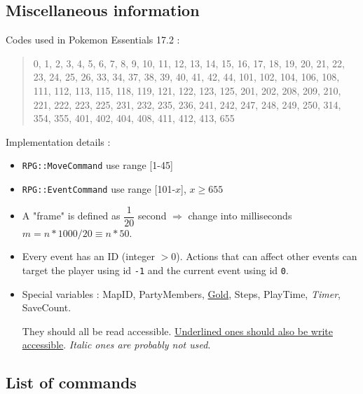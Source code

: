 \documentclass[11pt]{article}
\begin{document}

\subsection{Miscellaneous information}

Codes used in Pokemon Essentials 17.2 :
\begin{quote}
	0, 1, 2, 3, 4, 5, 6, 7, 8, 9, 10, 11, 12, 13, 14, 15, 16, 17, 18, 19, 20, 21, 22, 23, 24, 25, 26, 33, 34, 37, 38, 39, 40, 41, 42, 44, 101, 102, 104, 106, 108, 111, 112, 113, 115, 118, 119, 121, 122, 123, 125, 201, 202, 208, 209, 210, 221, 222, 223, 225, 231, 232, 235, 236, 241, 242, 247, 248, 249, 250, 314, 354, 355, 401, 402, 404, 408, 411, 412, 413, 655
\end{quote}

Implementation details :
\begin{itemize}
	\item \verb|RPG::MoveCommand| use range [1-45]
	
	\item \verb|RPG::EventCommand| use range [101-$x$], $x\geq 655$
	
	\item A "frame" is defined as $\dfrac{1}{20}$ second $\Rightarrow$ change into milliseconds $m=n*1000/20\equiv n*50$.
	
	\item Every event has an ID (integer $>0$). Actions that can affect other events can target the player using id \verb|-1| and the current event using id \verb|0|.
	
	\item Special variables : MapID, PartyMembers, \underline{Gold}, Steps, PlayTime, \textit{Timer}, SaveCount.
	
	They should all be read accessible. \underline{Underlined ones should also be write accessible}. \textit{Italic ones are probably not used}.
\end{itemize}

\vspace{4mm}
\subsection{List of commands}
\end{document}
